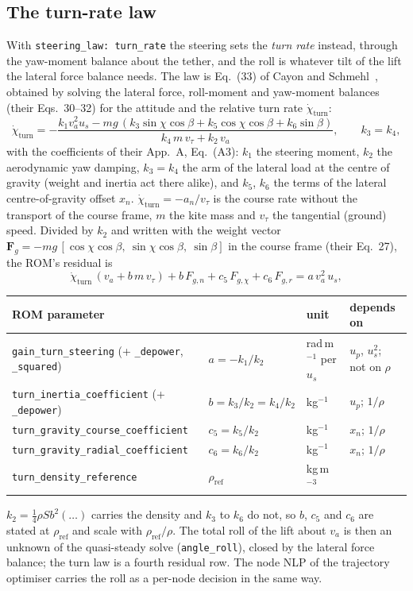 \documentclass[11pt,a4paper]{article}
\newcommand{\code}[1]{\texttt{\small #1}}
\begin{document}
\subsection{The turn-rate law}
\label{sec:turn-law}
With \code{steering\_law: turn\_rate} the steering sets the \emph{turn rate} instead,
through the yaw-moment balance about the tether, and the roll is whatever tilt of the
lift the lateral force balance needs. The law is Eq.~(33) of
Cayon and Schmehl~\cite{cayon2026turn}, obtained by solving the lateral force,
roll-moment and yaw-moment balances (their Eqs.~30--32) for the attitude and the
relative turn rate $\dot\chi_\mathrm{turn}$:
\begin{equation}
  \dot\chi_\mathrm{turn}
  = -\frac{k_1 v_a^2 u_s - mg\,(k_3\sin\chi\cos\beta + k_5\cos\chi\cos\beta + k_6\sin\beta)}
          {k_4\, m\, v_\tau + k_2\, v_a},
  \qquad k_3=k_4,
  \label{eq:turn-law}
\end{equation}
with the coefficients of their App.~A, Eq.~(A3): $k_1$ the steering moment, $k_2$ the
aerodynamic yaw damping, $k_3=k_4$ the arm of the lateral load at the centre of
gravity (weight and inertia act there alike), and $k_5$, $k_6$ the terms of the
lateral centre-of-gravity offset $x_n$. $\dot\chi_\mathrm{turn}=-a_n/v_\tau$ is the
course rate without the transport of the course frame, $m$ the kite mass and
$v_\tau$ the tangential (ground) speed. Divided by $k_2$ and written with the
weight vector $\mathbf F_g=-mg\,[\cos\chi\cos\beta,\ \sin\chi\cos\beta,\ \sin\beta]$
in the course frame (their Eq.~27), the ROM's residual is
\begin{equation}
  \dot\chi_\mathrm{turn}\,(v_a + b\,m\,v_\tau) + b\,F_{g,n} + c_5\,F_{g,\chi} + c_6\,F_{g,r}
  = a\,v_a^2\,u_s ,
  \label{eq:turn-law-rom}
\end{equation}
\begin{center}\small
\begin{tabular}{llll}
\toprule
ROM parameter & & unit & depends on\\
\midrule
\code{gain\_turn\_steering} (+ \code{\_depower}, \code{\_squared}) & $a=-k_1/k_2$
  & rad\,m$^{-1}$ per $u_s$ & $u_p$, $u_s^2$; not on $\rho$\\
\code{turn\_inertia\_coefficient} (+ \code{\_depower}) & $b=k_3/k_2=k_4/k_2$
  & kg$^{-1}$ & $u_p$; $1/\rho$\\
\code{turn\_gravity\_course\_coefficient} & $c_5=k_5/k_2$ & kg$^{-1}$ & $x_n$; $1/\rho$\\
\code{turn\_gravity\_radial\_coefficient} & $c_6=k_6/k_2$ & kg$^{-1}$ & $x_n$; $1/\rho$\\
\code{turn\_density\_reference} & $\rho_\mathrm{ref}$ & kg\,m$^{-3}$ & \\
\bottomrule
\end{tabular}
\end{center}
$k_2=\tfrac14\rho S b^2(\dots)$ carries the density and $k_3$ to $k_6$ do not, so $b$,
$c_5$ and $c_6$ are stated at $\rho_\mathrm{ref}$ and scale with $\rho_\mathrm{ref}/\rho$.
The total roll of the lift about $v_a$ is then an unknown of the quasi-steady solve
(\code{angle\_roll}), closed by the lateral force balance; the turn law is a fourth
residual row. The node NLP of the trajectory optimiser carries the roll as a per-node
decision in the same way.
\end{document}
